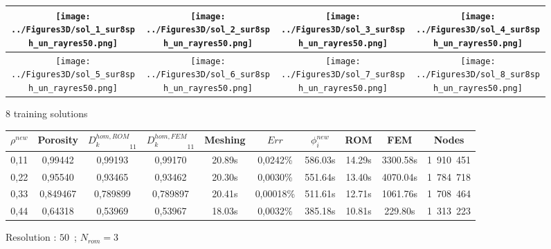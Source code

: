 {\ligneinter
\begin{figure}[H]%
%
\begin{center}
\begin{tabular}{|c|c|c|c|}
\hline
\texttt{[image: ../Figures3D/sol\_1\_sur8sph\_un\_rayres50.png]}%
&%
\texttt{[image: ../Figures3D/sol\_2\_sur8sph\_un\_rayres50.png]}%
&%
\texttt{[image: ../Figures3D/sol\_3\_sur8sph\_un\_rayres50.png]}%
&%
\texttt{[image: ../Figures3D/sol\_4\_sur8sph\_un\_rayres50.png]}%
\\
\hline
\texttt{[image: ../Figures3D/sol\_5\_sur8sph\_un\_rayres50.png]}%
&%
\texttt{[image: ../Figures3D/sol\_6\_sur8sph\_un\_rayres50.png]}%
&%
\texttt{[image: ../Figures3D/sol\_7\_sur8sph\_un\_rayres50.png]}%
&%
\texttt{[image: ../Figures3D/sol\_8\_sur8sph\_un\_rayres50.png]}%
\\
\hline
\end{tabular}
\end{center}
\caption{$8$ training solutions}
%
\end{figure}

\begin{figure}[H]%
%
\begin{center}
\begin{tabular}{|c|c||c|c||c|c||c|c||c||c|}
\hline
\rowcolor{lightgray} $\rho^{new}$&Porosity&${D_k^{hom,ROM}}_{11}$&${D_k^{hom,FEM}}_{11}$&Meshing&$Err$&$\phi_i^{new}$&ROM&FEM&Nodes\\
\hline
0,11&0,99442&0,99193&0,99170&20.89s&0,0242\%&586.03s&14.29s&3300.58s&1\ 910\ 451\\
\hline
0,22&0,95540&0,93465&0,93462&20.30s&0,0030\%&551.64s&13.40s&4070.04s&1\ 784\ 718\\
\hline
0,33&0,849467&0,789899&0,789897&20.41s&0,00018\%&511.61s&12.71s&1061.76s&1\ 708\ 464\\
\hline
0,44&0,64318&0,53969&0,53967&18.03s&0,0032\%&385.18s&10.81s&229.80s&1\ 313\ 223\\
\hline
\end{tabular}
\end{center}
\caption{Resolution : $50$\ ; $N_{rom}=3$}
%
\end{figure}

\ligneinter

}
